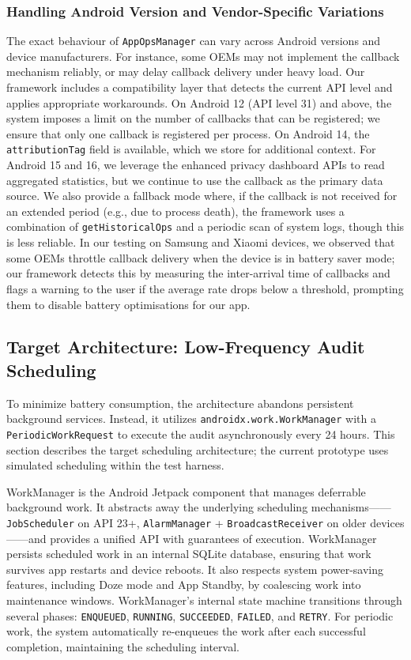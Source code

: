 \subsubsection{Handling Android Version and Vendor-Specific Variations}

The exact behaviour of \texttt{AppOpsManager} can vary across Android versions and device manufacturers. For instance, some OEMs may not implement the callback mechanism reliably, or may delay callback delivery under heavy load. Our framework includes a compatibility layer that detects the current API level and applies appropriate workarounds. On Android 12 (API level 31) and above, the system imposes a limit on the number of callbacks that can be registered; we ensure that only one callback is registered per process. On Android 14, the \texttt{attributionTag} field is available, which we store for additional context. For Android 15 and 16, we leverage the enhanced privacy dashboard APIs to read aggregated statistics, but we continue to use the callback as the primary data source. We also provide a fallback mode where, if the callback is not received for an extended period (e.g., due to process death), the framework uses a combination of \texttt{getHistoricalOps} and a periodic scan of system logs, though this is less reliable. In our testing on Samsung and Xiaomi devices, we observed that some OEMs throttle callback delivery when the device is in battery saver mode; our framework detects this by measuring the inter-arrival time of callbacks and flags a warning to the user if the average rate drops below a threshold, prompting them to disable battery optimisations for our app.

\subsection{Target Architecture: Low-Frequency Audit Scheduling}

To minimize battery consumption, the architecture abandons persistent background services. Instead, it utilizes \texttt{androidx.work.WorkManager} with a \texttt{PeriodicWorkRequest} to execute the audit asynchronously every 24 hours. This section describes the target scheduling architecture; the current prototype uses simulated scheduling within the test harness.

WorkManager is the Android Jetpack component that manages deferrable background work. It abstracts away the underlying scheduling mechanisms——\texttt{JobScheduler} on API 23+, \texttt{AlarmManager} + \texttt{BroadcastReceiver} on older devices——and provides a unified API with guarantees of execution. WorkManager persists scheduled work in an internal SQLite database, ensuring that work survives app restarts and device reboots. It also respects system power-saving features, including Doze mode and App Standby, by coalescing work into maintenance windows. WorkManager's internal state machine transitions through several phases: \texttt{ENQUEUED}, \texttt{RUNNING}, \texttt{SUCCEEDED}, \texttt{FAILED}, and \texttt{RETRY}. For periodic work, the system automatically re-enqueues the work after each successful completion, maintaining the scheduling interval.


